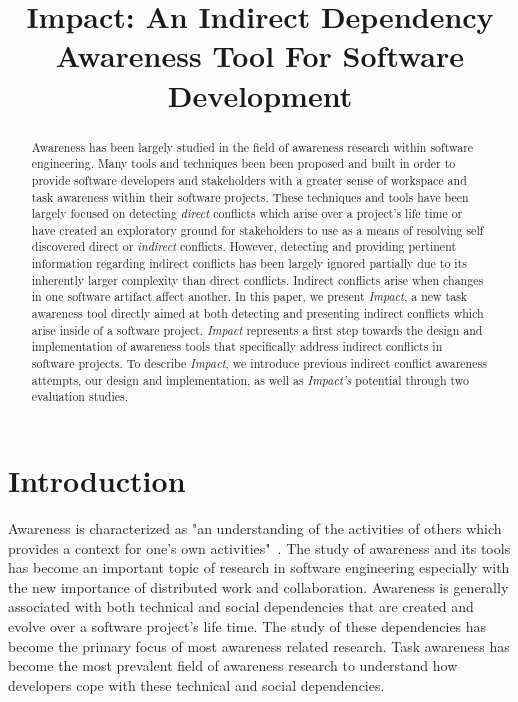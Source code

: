 \documentclass[conference]{IEEEtran}
\begin{document}
\title{Impact: An Indirect Dependency Awareness Tool For Software Development}

\author{
\and
{}
}

\maketitle

\begin{abstract}
Awareness has been largely studied in the field of awareness research within
software engineering. Many tools and techniques been been proposed and built
in order to provide software developers and stakeholders with a greater
sense of workspace and task awareness within their software projects. These
techniques and tools have been largely focused on detecting \textit{direct} 
conflicts which arise over a project's life time or have created 
an exploratory ground for stakeholders to use as a means of resolving self
discovered direct or \textit{indirect} conflicts. However, detecting 
and providing pertinent information regarding indirect conflicts has been
largely ignored partially due to its inherently larger
complexity than direct conflicts. Indirect conflicts arise when changes
in one software artifact affect another. In this paper, we present
\textit{Impact}, a new task awareness tool directly aimed at both detecting
and presenting indirect conflicts which arise inside of a software project.
\textit{Impact} represents a first step towards the design and implementation
of awareness tools that specifically address indirect conflicts in software
projects. To describe \textit{Impact}, we introduce previous indirect 
conflict awareness attempts, our design 
and implementation, as well as \textit{Impact's} potential through
two evaluation studies. 
\end{abstract}


\section{Introduction}
Awareness is characterized as "an understanding of the activities of others
which provides a context for one's own activities"~\cite{Dourish:1992:ACS}.
The study of awareness and its tools has become an important topic of
research in software engineering especially with the new importance of
distributed work and collaboration. Awareness is generally associated with
both technical and social dependencies that are created and evolve over
a software project's life time. The study of these dependencies has become
the primary focus of most awareness related research. Task awareness has
become the most prevalent field of awareness research to understand 
how developers cope with these technical and social dependencies.
\end{document}
